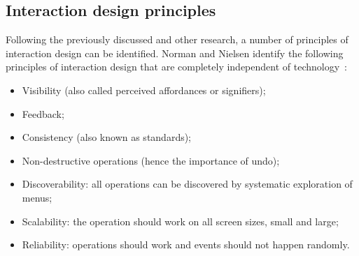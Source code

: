 \subsection[Principles]{Interaction design principles}
Following the previously discussed and other research, a number of principles of interaction design can be identified. %
Norman and Nielsen identify the following principles of interaction design that are completely independent of technology~\cite{norman2010gestural}:
\begin{itemize}[noitemsep,topsep=0pt,parsep=0pt,partopsep=0pt]
\item Visibility (also called perceived affordances or signifiers);
\item Feedback;
\item Consistency (also known as standards);
\item Non-destructive operations (hence the importance of undo);
\item Discoverability: all operations can be discovered by systematic exploration of menus;
\item Scalability: the operation should work on all screen sizes, small and large;
\item Reliability: operations should work and events should not happen randomly.
\end{itemize}
